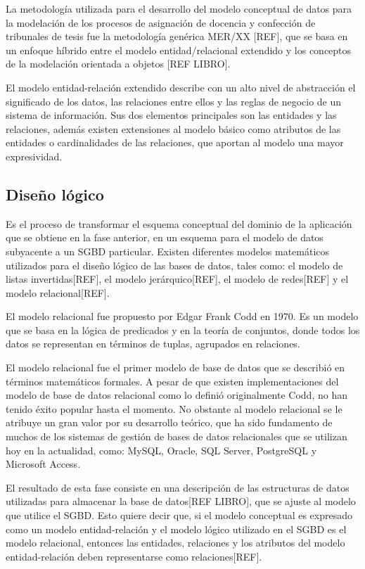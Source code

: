 La metodología utilizada 
para el desarrollo del modelo conceptual de datos para la modelación 
de los procesos de asignación de docencia y confección de tribunales de 
tesis fue la metodología genérica MER/XX [REF], que se basa en un enfoque
híbrido entre el modelo entidad/relacional extendido y los conceptos de la 
modelación orientada a objetos [REF LIBRO]. 

El modelo entidad-relación extendido describe con un alto nivel de abstracción
el significado de los datos, las relaciones entre ellos y las reglas de negocio 
de un sistema de información. Sus dos elementos principales son las entidades y 
las relaciones, además existen extensiones al modelo básico 
como atributos de las entidades o cardinalidades de las relaciones, 
que aportan al modelo una mayor expresividad.



\subsection{Diseño lógico}
Es el proceso de transformar el esquema conceptual del dominio de la aplicación
que se obtiene en la fase anterior,
en un esquema para el modelo de datos subyacente a un SGBD particular.
Existen diferentes modelos matemáticos utilizados para el diseño lógico
de las bases de datos, tales como: el modelo de listas invertidas[REF], el modelo 
jerárquico[REF], el modelo de redes[REF] y el modelo relacional[REF]. 

El modelo relacional fue propuesto por Edgar Frank Codd en 1970. Es un 
modelo que se basa en la lógica de predicados y en la teoría 
de conjuntos, donde todos los datos se representan en términos de tuplas, 
agrupados en relaciones.

El modelo relacional fue el primer modelo de base de datos que se describió en términos 
matemáticos formales. A pesar de que existen  
implementaciones del modelo de base de datos relacional como lo definió originalmente 
Codd, no han tenido éxito popular hasta el momento. No obstante al modelo relacional se le 
atribuye un gran valor por su desarrollo teórico, que ha sido fundamento de muchos de los 
sistemas de gestión de bases de datos relacionales que se utilizan hoy en la actualidad, como:
MySQL, Oracle, SQL Server, PostgreSQL y Microsoft Access. 

El resultado de esta fase consiste en una descripción de las estructuras 
de datos utilizadas para almacenar la base de datos[REF LIBRO], que se 
ajuste al modelo que utilice el SGBD. Esto quiere decir que,
si el modelo conceptual es expresado como un modelo 
entidad-relación y el modelo lógico utilizado en el SGBD es el modelo 
relacional, entonces las entidades, relaciones y los atributos del modelo entidad-relación
deben representarse como relaciones[REF]. 


